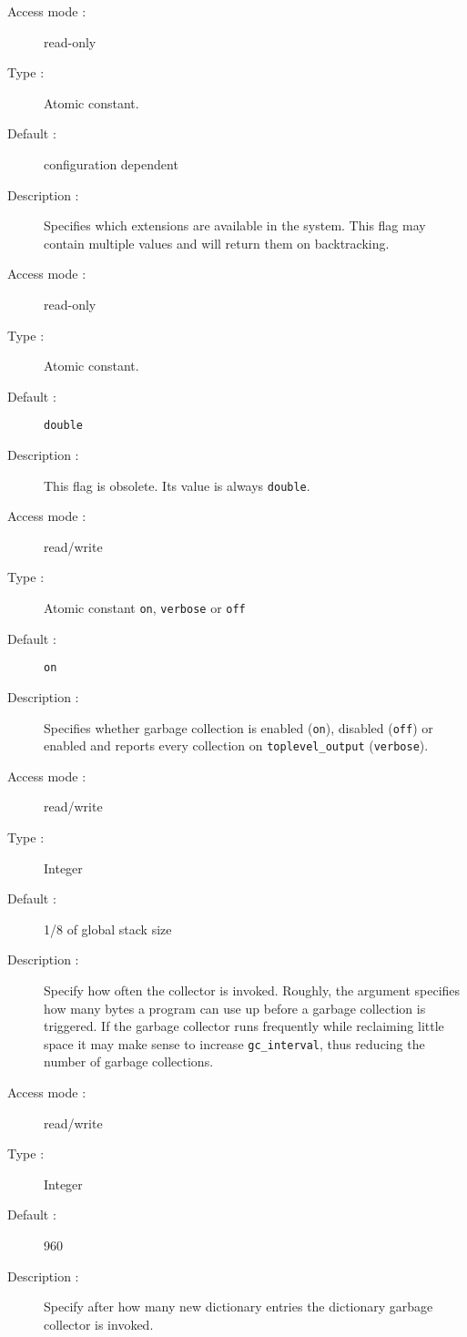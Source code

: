 \begin{description}
\pagebreak[3]
\begin{description}
\item[Access mode :] read-only
\item[Type :] Atomic constant.
\item[Default : ] configuration dependent
\item[Description :] Specifies which extensions are available in the system.
This flag may contain multiple values and will return them on backtracking.
\end{description}

\begin{description}
\item[Access mode :] read-only
\item[Type :] Atomic constant.
\item[Default : ] {\tt double}
\item[Description :] This flag is obsolete. Its value is always {\tt double}.
\end{description}

\begin{description}
\item[Access mode : ] read/write
\item[Type : ] Atomic constant {\tt on}, {\tt verbose} or {\tt off} 
\item[Default : ] {\tt on}
\item[Description : ] Specifies whether garbage collection is enabled
({\tt on}), disabled ({\tt off}) or enabled and reports every collection
on {\tt toplevel_output} ({\tt verbose}).
\end{description}

\begin{description}
\item[Access mode : ] read/write
\item[Type : ] Integer
\item[Default : ] 1/8 of global stack size
\item[Description : ] 
Specify how often the collector is invoked. Roughly, the argument
specifies how many bytes a program can use up before
a garbage collection is triggered.
If the garbage collector runs frequently while reclaiming little space
it may make sense to increase {\tt gc_interval}, thus reducing the number
of garbage collections.
\end{description}

\begin{description}
\item[Access mode : ] read/write
\item[Type : ] Integer
\item[Default : ] 960
\item[Description : ] 
Specify after how many new dictionary entries the dictionary gar\-bage collector is invoked.
\end{description}


\end{description}
